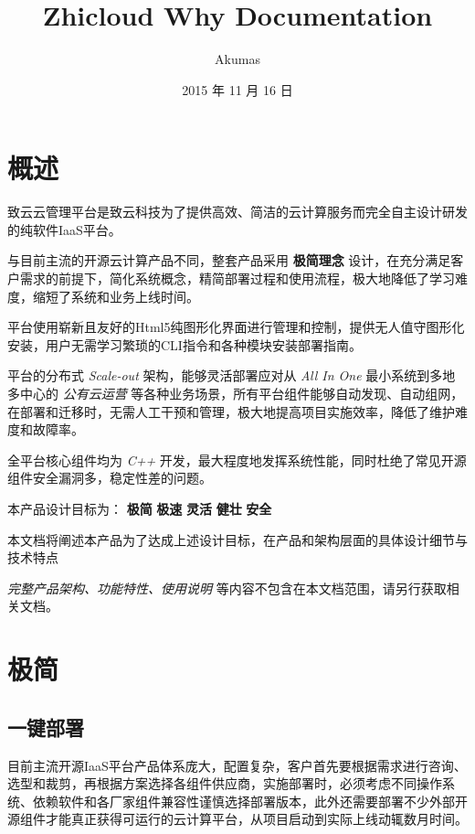 \documentclass[letterpaper,10pt]{sphinxmanual}
\title{Zhicloud Why Documentation}
\date{2015 年 11 月 16 日}
\author{Akumas}
\begin{document}
\maketitle
\tableofcontents
{}\label{index::doc}\begin{quote}
\end{quote}




\chapter{概述}
\label{index:id2}\label{index:id1}
致云云管理平台是致云科技为了提供高效、简洁的云计算服务而完全自主设计研发的纯软件IaaS平台。

与目前主流的开源云计算产品不同，整套产品采用 \textbf{极简理念} 设计，在充分满足客户需求的前提下，简化系统概念，精简部署过程和使用流程，极大地降低了学习难度，缩短了系统和业务上线时间。

平台使用崭新且友好的Html5纯图形化界面进行管理和控制，提供无人值守图形化安装，用户无需学习繁琐的CLI指令和各种模块安装部署指南。

平台的分布式 \emph{Scale-out} 架构，能够灵活部署应对从 \emph{All In One} 最小系统到多地多中心的 \emph{公有云运营} 等各种业务场景，所有平台组件能够自动发现、自动组网，在部署和迁移时，无需人工干预和管理，极大地提高项目实施效率，降低了维护难度和故障率。

全平台核心组件均为 \emph{C++} 开发，最大程度地发挥系统性能，同时杜绝了常见开源组件安全漏洞多，稳定性差的问题。

本产品设计目标为： \textbf{极简} \textbf{极速} \textbf{灵活} \textbf{健壮} \textbf{安全}

本文档将阐述本产品为了达成上述设计目标，在产品和架构层面的具体设计细节与技术特点

\emph{完整产品架构、功能特性、使用说明} 等内容不包含在本文档范围，请另行获取相关文档。


\chapter{极简}
\label{index:id3}

\section{一键部署}
\label{index:id4}
目前主流开源IaaS平台产品体系庞大，配置复杂，客户首先要根据需求进行咨询、选型和裁剪，再根据方案选择各组件供应商，实施部署时，必须考虑不同操作系统、依赖软件和各厂家组件兼容性谨慎选择部署版本，此外还需要部署不少外部开源组件才能真正获得可运行的云计算平台，从项目启动到实际上线动辄数月时间。
\end{document}
